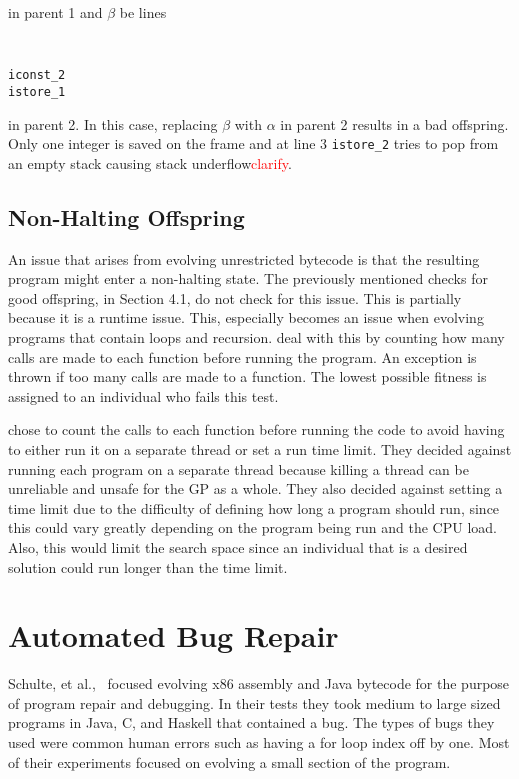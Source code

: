 \documentclass{sig-alternate}
\newcommand{\mycomment}[1]{\textcolor{red}{#1}}
\begin{document}
in parent 1 and $\beta$ be lines 
{\tt
\begin{verbatim}
iconst_2
istore_1
\end{verbatim}}
in parent 2. In this case, replacing $\beta$ with $\alpha$ in parent 2 results in a bad offspring. Only one integer is saved on the frame and at line 3 \texttt{istore\_2} tries to pop from an empty stack causing stack underflow\mycomment{clarify}.

\subsection{Non-Halting Offspring}
An issue that arises from evolving unrestricted bytecode is that the resulting program might enter a non-halting state. The previously mentioned checks for good offspring, in Section 4.1, do not check for this issue. This is partially because it is a runtime issue. This, especially becomes an issue when evolving programs that contain loops and recursion.
\cite{FINCH:2011} deal with this by counting how many calls are made to each function before running the program. An exception is thrown if too many calls are made to a function. The lowest possible fitness is assigned to an individual who fails this test.\par

\cite{FINCH:2011} chose to count the calls to each function before running the code to avoid having to either run it on a separate thread or set a run time limit. They decided against running each program on a separate thread because killing a thread can be unreliable and unsafe for the GP as a whole. They also decided against setting a time limit due to the difficulty of defining how long a program should run, since this could vary greatly depending on the program being run and the CPU load. Also, this would limit the search space since an individual that is a desired solution could run longer than the time limit.


\section{Automated Bug Repair}
Schulte, et al.,~\cite{Assembly:2010} focused evolving x86 assembly and Java bytecode for the purpose of program repair and debugging. In their tests they took medium to large sized programs in Java, C, and Haskell that contained a bug. The types of bugs they used were common human errors such as having a for loop index off by one. Most of their experiments focused on evolving a small section of the program. 
\end{document}
